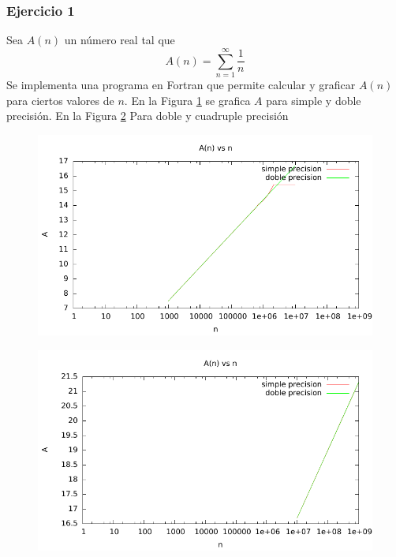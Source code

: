 \subsubsection{Ejercicio 1}

Sea $A(n)$ un número real tal que
\begin{equation}
A(n) = \sum_{n=1}^\infty \dfrac{1}{n}
\end{equation}
Se implementa una programa en Fortran que permite calcular y graficar $A(n)$ para ciertos valores de $n$. En la Figura \ref{fig_P1_1_1} se grafica $A$ para simple y doble precisión. En la Figura \ref{fig_P1_1_2} Para doble y cuadruple precisión

\begin{figure} [H]
\includegraphics{./parte2/graficos/grafico_p1_1.pdf}
\caption{} \label{fig_P1_1_1}
\end{figure}

\begin{figure} [H]
\includegraphics{./parte2/graficos/grafico_p1_2.pdf}
\caption{} \label{fig_P1_1_2}
\end{figure}

